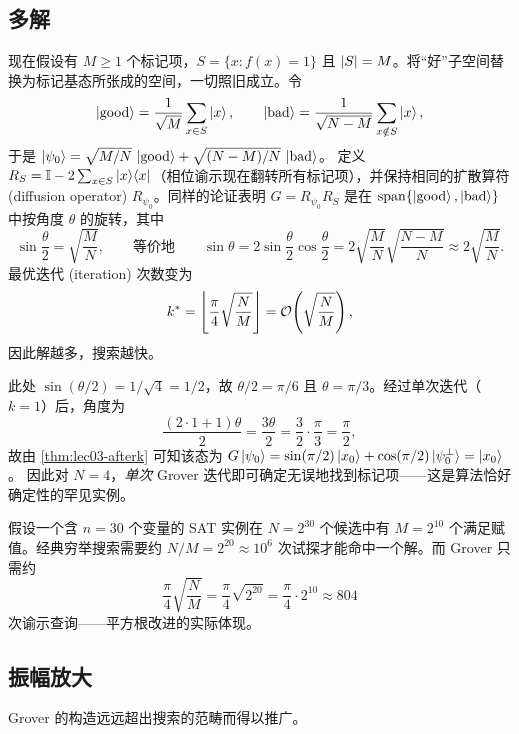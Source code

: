 \subsection{多解}

现在假设有 $M\ge1$ 个标记项，$S=\{x:f(x)=1\}$ 且 $\left\lvert S \right\rvert=M$。将“好”子空间替换为标记基态所张成的空间，一切照旧成立。令
\[
  \ket{\mathrm{good}}=\frac{1}{\sqrt M}\sum_{x\in S}\ket{x},
  \qquad
  \ket{\mathrm{bad}}=\frac{1}{\sqrt{N-M}}\sum_{x\notin S}\ket{x},
\]
于是
$\ket{\psi_0}=\sqrt{M/N}\,\ket{\mathrm{good}}+\sqrt{(N-M)/N}\,\ket{\mathrm{bad}}$。
定义 $R_S=\mathbb{I}-2\sum_{x\in S}\ket{x}\!\bra{x}$（相位谕示现在翻转所有标记项），并保持相同的扩散算符 (diffusion operator) $R_{\psi_0}$。同样的论证表明 $G=R_{\psi_0}R_S$ 是在 $\operatorname{span}\{\ket{\mathrm{good}},\ket{\mathrm{bad}}\}$ 中按角度 $\theta$ 的旋转，其中
\[
  \sin\frac{\theta}{2}=\sqrt{\frac{M}{N}},
  \qquad\text{等价地}\qquad
  \sin\theta=2\sin\frac{\theta}{2}\cos\frac{\theta}{2}
            =2\sqrt{\frac{M}{N}}\sqrt{\frac{N-M}{N}}\approx 2\sqrt{\frac{M}{N}}.
\]
最优迭代 (iteration) 次数变为
\[
  k^{\ast}=\left\lfloor\frac{\pi}{4}\sqrt{\frac{N}{M}}\right\rfloor
  =\mathcal{O}\!\left(\sqrt{\frac{N}{M}}\right),
\]
因此解越多，搜索越快。

\begin{example}[精确情形 $N=4$，$M=1$]
\label{exa:lec03-n4}
此处 $\sin(\theta/2)=1/\sqrt4=1/2$，故 $\theta/2=\pi/6$ 且 $\theta=\pi/3$。经过单次迭代（$k=1$）后，角度为
\[
  \frac{(2\cdot1+1)\theta}{2}=\frac{3\theta}{2}=\frac{3}{2}\cdot\frac{\pi}{3}=\frac{\pi}{2},
\]
故由 \cref{thm:lec03-afterk} 可知该态为
$G\ket{\psi_0}=\sin(\pi/2)\ket{x_0}+\cos(\pi/2)\ket{\psi_0^{\perp}}=\ket{x_0}$。
因此对 $N=4$，\emph{单次} Grover 迭代即可确定无误地找到标记项——这是算法恰好确定性的罕见实例。
\end{example}

\begin{example}[一个多解估计]
\label{exa:lec03-satcount}
假设一个含 $n=30$ 个变量的 SAT 实例在 $N=2^{30}$ 个候选中有 $M=2^{10}$ 个满足赋值。经典穷举搜索需要约 $N/M=2^{20}\approx10^{6}$ 次试探才能命中一个解。而 Grover 只需约
\[
  \frac{\pi}{4}\sqrt{\frac{N}{M}}
    =\frac{\pi}{4}\sqrt{2^{20}}
    =\frac{\pi}{4}\cdot2^{10}\approx804
\]
次谕示查询——平方根改进的实际体现。
\end{example}

\subsection{振幅放大}

Grover 的构造远远超出搜索的范畴而得以推广。

